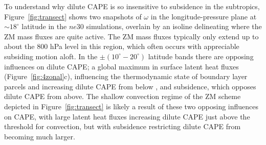 \documentclass[times]{qjrms4}
\begin{document}
To understand why dilute CAPE is so insensitive to subsidence in the subtropics, Figure~\ref{fig:transect} shows two snapshots of $\omega$ in the longitude-pressure plane at  $\sim 18^{\circ}$ latitude in the $ne30$ simulations, overlain by an isoline delineating where the ZM mass fluxes are quite active. The ZM mass fluxes typically only extend up to about the $800$ hPa level in this region, which often occurs with appreciable subsiding motion aloft. In the $\pm \left(10^{\circ}-20^{\circ} \right)$ latitude bands there are opposing influences on dilute CAPE; a global maximum in surface latent heat fluxes (Figure~\ref{fig:4zonal}c), influencing the thermodynamic state of boundary layer parcels and increasing dilute CAPE from below \citep{Z2002JGR}, and subsidence, which opposes dilute CAPE from above. The shallow convection regime of the ZM scheme depicted in Figure~\ref{fig:transect} is likely a result of these two opposing influences on CAPE, with large latent heat fluxes increasing dilute CAPE just above the threshold for convection, but with subsidence restricting dilute CAPE from becoming much larger.
\end{document}

